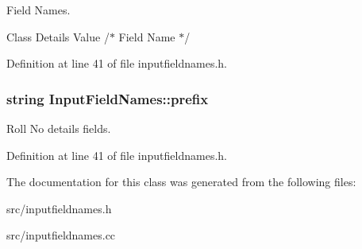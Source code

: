 Field Names. 

Class Details Value /$\ast$ Field Name $\ast$/ 

Definition at line 41 of file inputfieldnames.\-h.

\hypertarget{classInputFieldNames_a6b73b0278aac9c72ce168717674261c7}{
\subsubsection[{prefix}]{\setlength{\rightskip}{0pt plus 5cm}string Input\-Field\-Names\-::prefix}}\label{classInputFieldNames_a6b73b0278aac9c72ce168717674261c7}


Roll No details fields. 



Definition at line 41 of file inputfieldnames.\-h.



The documentation for this class was generated from the following files\-:\begin{DoxyCompactItemize}
\item 
src/inputfieldnames.\-h\item 
src/inputfieldnames.\-cc\end{DoxyCompactItemize}
